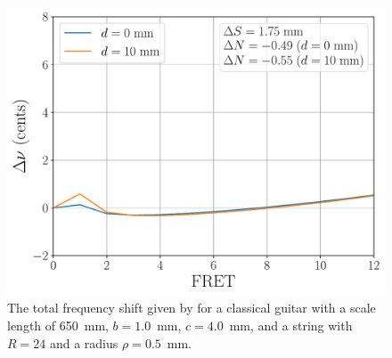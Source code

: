 
\begin{figure}
  \centering
  \includegraphics[width=5.0in]{../figures/comp_est}
  \caption{\label{fig:comp_est} The total frequency shift given by  for a classical guitar with a scale length of 650~mm, $b = 1.0$~mm, $c = 4.0$~mm, and a string with $R = 24$ and a radius $\rho = 0.5$~mm.}
\end{figure}


